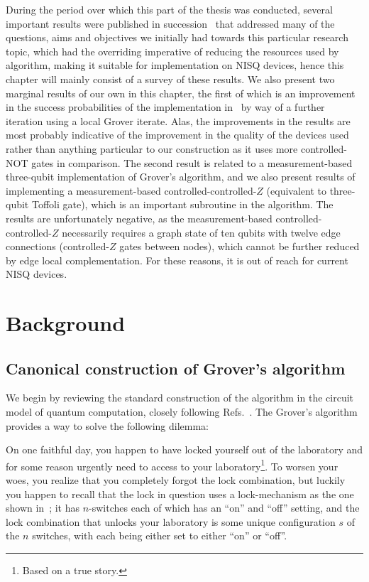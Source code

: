 \clearpage
\noindent
During the period over which this part of the thesis was conducted, several important results were published in succession~\cite{Zhang_2020,Wang_2020,Satoh_2020,Gwinner_2020,Brianski_2021,Zhang_2021} that addressed many of the questions, aims and objectives we initially had towards this particular research topic, which had the overriding imperative of reducing the resources used by algorithm, making it suitable for implementation on \acs{NISQ} devices, hence this chapter will mainly consist of a survey of these results. We also present two marginal results of our own in this chapter, the first of which is an improvement in the success probabilities of the implementation in~\cite{Satoh_2020} by way of a further iteration using a local Grover iterate. Alas, the improvements in the results are most probably indicative of the improvement in the quality of the devices used rather than anything particular to our construction as it uses more controlled-NOT gates in comparison. The second result is related to a measurement-based three-qubit implementation of Grover's algorithm, and we also present results of implementing a measurement-based controlled-controlled-$Z$ (equivalent to three-qubit Toffoli gate), which is an important subroutine in the algorithm. The results are unfortunately negative, as the measurement-based controlled-controlled-$Z$ necessarily requires a graph state of ten qubits with twelve edge connections (controlled-$Z$ gates between nodes), which cannot be further reduced by edge local complementation. For these reasons, it is out of reach for current \acs{NISQ} devices.

\section{Background}

\subsection{Canonical construction of Grover's algorithm}

We begin by reviewing the standard construction of the algorithm in the circuit model of quantum computation, closely following Refs.~\cite{Grover_1997, Mike&Ike, Dewolf_2019}. The Grover's algorithm provides a way to solve the following dilemma:


\bigskip
\noindent
On one faithful day, you happen to have locked yourself out of the laboratory and for some reason urgently need to access to your laboratory\footnote{Based on a true story.}. To worsen your woes, you realize that you completely forgot the lock combination, but luckily you happen to recall that the lock in question uses a lock-mechanism as the one shown in~; it has $n$-switches each of which has an \enquote{on} and \enquote{off} setting, and the lock combination that unlocks your laboratory is some unique configuration $s$ of the $n$ switches, with each being either set to either \enquote{on} or \enquote{off}.

